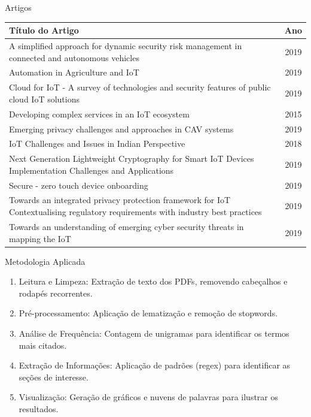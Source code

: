 \documentclass{beamer}
\begin{document}
\begin{frame}{Artigos}
    \begin{table}
    \centering
    \footnotesize
    \begin{tabular}{|p{8cm}|c|}
        \hline
        \textbf{Título do Artigo} & \textbf{Ano} \\
        \hline
        A simplified approach for dynamic security risk management in connected and autonomous vehicles & 2019 \\
        \hline
        Automation in Agriculture and IoT & 2019 \\
        \hline
        Cloud for IoT - A survey of technologies and security features of public cloud IoT solutions & 2019 \\
        \hline
        Developing complex services in an IoT ecosystem & 2015 \\
        \hline
        Emerging privacy challenges and approaches in CAV systems & 2019 \\
        \hline
        IoT Challenges and Issues in Indian Perspective & 2018 \\
        \hline
        Next Generation Lightweight Cryptography for Smart IoT Devices Implementation Challenges and Applications & 2019 \\
        \hline
        Secure - zero touch device onboarding & 2019 \\
        \hline
        Towards an integrated privacy protection framework for IoT Contextualising regulatory requirements with industry best practices & 2019 \\
        \hline
        Towards an understanding of emerging cyber security threats in mapping the IoT & 2019 \\
        \hline
    \end{tabular}
    \end{table}
\end{frame}

\begin{frame}{Metodologia Aplicada}
    \begin{enumerate}
        \item Leitura e Limpeza: Extração de texto dos PDFs, removendo cabeçalhos e rodapés recorrentes.
        \item Pré-processamento: Aplicação de lematização e remoção de stopwords.
        \item Análise de Frequência: Contagem de unigramas para identificar os termos mais citados.
        \item Extração de Informações: Aplicação de padrões (regex) para identificar as seções de interesse.
        \item Visualização: Geração de gráficos e nuvens de palavras para ilustrar os resultados.
    \end{enumerate}
\end{frame}
\end{document}

